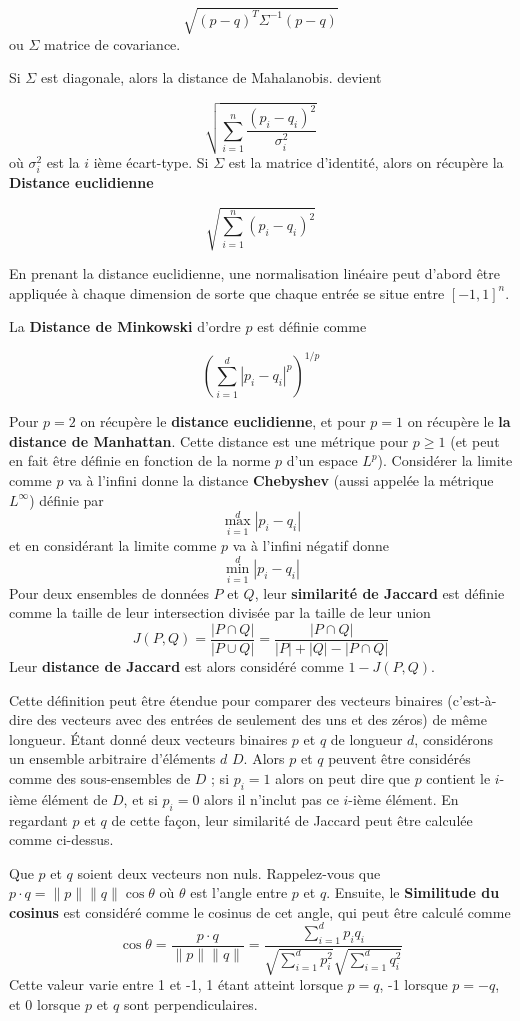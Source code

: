 \[
\sqrt{(p - q)^T \Sigma^{-1} (p - q)}
\]
ou $\Sigma$ matrice de covariance.

Si $\Sigma$ est diagonale, alors  
la distance de Mahalanobis. devient

\[
\sqrt{\sum_{i=1}^n \frac{(p_i - q_i)^2}{\sigma_i^2}}
\]
où $\sigma_i^2$ est la $i$ ième écart-type.
Si $\Sigma$ est la matrice d'identité, alors on récupère la \textbf{Distance euclidienne}

\[
\sqrt{\sum_{i=1}^n (p_i - q_i)^2}
\]

En prenant la distance euclidienne, une normalisation linéaire peut d'abord être appliquée à chaque dimension de sorte que chaque entrée se situe entre $[-1,1]^n$.

La \textbf{Distance de Minkowski} d'ordre $p$ est définie comme

\[
\left( \sum_{i=1}^d |p_i - q_i|^p \right)^{1/p}
\]

Pour $p=2$ on récupère le \textbf{distance euclidienne},
et pour $p=1$ on récupère le \textbf{la distance de Manhattan}.
Cette distance est une métrique pour $p \geq 1$ 
(et peut en fait être définie en fonction de la norme $p$ d'un espace $L^p$).
Considérer la limite comme $p$ va à l'infini donne la distance \textbf{Chebyshev} (aussi appelée la métrique $L^\infty$) définie par
\[
\max_{i=1}^d |p_i - q_i|
\]
et en considérant la limite comme $p$ va à l'infini négatif donne
\[
\min_{i=1}^d |p_i - q_i|
\]
Pour deux ensembles de données $P$ et $Q$, leur \textbf{similarité de Jaccard} est définie comme la taille de leur intersection divisée par la taille de leur union
\[
J(P, Q)
= \frac{|P \cap Q|}{|P \cup Q|}
= \frac{|P \cap Q|}{|P| + |Q| - |P \cap Q|}
\]
Leur \textbf{distance de Jaccard} est alors considéré comme $1 - J(P, Q)$.

Cette définition peut être étendue pour comparer des vecteurs binaires (c'est-à-dire des vecteurs avec des entrées de seulement des uns et des zéros) de même longueur.
Étant donné deux vecteurs binaires $p$ et $q$ de longueur $d$, considérons un ensemble arbitraire d'éléments $d$ $D$.
Alors $p$ et $q$ peuvent être considérés comme des sous-ensembles de $D$ ; si $p_i=1$ alors on peut dire que $p$ contient le $i$-ième élément de $D$, et si $p_i=0$ alors il n'inclut pas ce $i$-ième élément.
En regardant $p$ et $q$ de cette façon, leur similarité de Jaccard peut être calculée comme ci-dessus.

Que $p$ et $q$ soient deux vecteurs non nuls.
Rappelez-vous que 
$p \cdot q 
= \lVert p \rVert \lVert q \rVert \cos\theta$
où $\theta$ est l'angle entre $p$ et $q$.
Ensuite, le \textbf{Similitude du cosinus} est considéré comme le cosinus de cet angle, qui peut être calculé comme
\[
\cos\theta
= \frac{p \cdot q}{\lVert p \rVert \lVert q \rVert}
= \frac{\sum_{i=1}^d p_i q_i}{\sqrt{\sum_{i=1}^d p_i^2} \sqrt{\sum_{i=1}^d q_i^2}}
\]
Cette valeur varie entre 1 et -1, 1 étant atteint lorsque $p=q$, -1 lorsque $p=-q$, et 0 lorsque $p$ et $q$ sont perpendiculaires.

